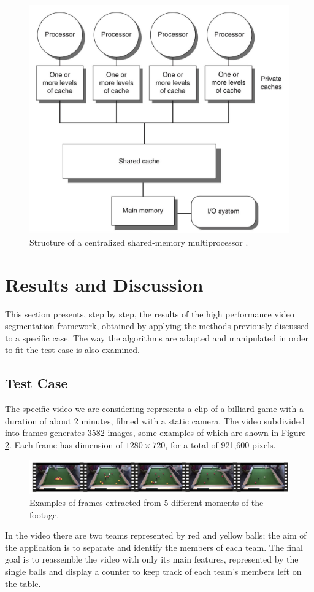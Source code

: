 \documentclass{usiinftr}
\begin{document}
\begin{figure}[h]
	\centering
	\includegraphics[width=0.35\linewidth]{img/multiprocessing}
	\caption{Structure of a centralized shared-memory multiprocessor \cite{15}.}
	\label{fig:3}
\end{figure}



\section{Results and Discussion}
This section presents, step by step, the results of the high performance video segmentation framework, obtained by applying the methods previously discussed to a specific case. The way the algorithms are adapted and manipulated in order to fit the test case is also examined. 

\subsection{Test Case}
The specific video we are considering represents a clip of a billiard game with a duration of about 2 minutes, filmed with a static camera. The video subdivided into frames generates 3582 images, some examples of which are shown in Figure \ref{fig:4}. Each frame has dimension of $1280 \times 720$,  for a total of 921,600 pixels.

\begin{figure}[h]
	\centering
	\includegraphics[width=0.98\linewidth]{img/video_frames}
	\caption{Examples of frames extracted from 5 different moments of the footage.}
	\label{fig:4}
\end{figure}

In the video there are two teams represented by red and yellow balls; the aim of the application is to separate and identify the members of each team. The final goal is to reassemble the video with only its main features, represented by the single balls and display a counter to keep track of each team's members left on the table. 
\end{document}
